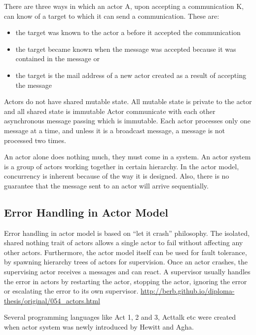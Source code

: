 There are three ways in which an actor A, upon accepting a communication K, can know of a target to which it can send a communication. These are:~\parencite{agha}
\begin{itemize}
  \item the target was known to the actor a before it accepted the communication
  \item the target became known when the message was accepted because it was contained in the message or
  \item the target is the mail address of a new actor created as a result of accepting the message
\end{itemize}

Actors do not have shared mutable state. All mutable state is private to the actor and all shared state is immutable
Actor communicate with each other asynchronous message passing which is immutable.
Each actor processes only one message at a time, and unless it is a broadcast message, a message is not processed two times.

An actor alone does nothing much, they must come in a system. An actor system is a group of actors working together in certain hierarchy.
In the actor model, concurrency is inherent because of the way it is designed. Also, there is no guarantee that the message sent to an actor will arrive sequentially.

\subsection{Error Handling in Actor Model}

Error handling in actor model is based on “let it crash” philosophy. The isolated, shared nothing trait of actors allows a single actor to fail without affecting any other actors. Furthermore, the actor model itself can be used for fault tolerance, by spawning hierarchy trees of actors for supervision. Once an actor crashes, the supervising actor receives a messages and can react. A supervisor usually handles the error in actors by restarting the actor, stopping the actor, ignoring the error or escalating the error to its own supervisor. \url{http://berb.github.io/diploma-thesis/original/054_actors.html}

Several programming languages like Act 1, 2 and 3, Acttalk etc were created when actor system was newly introduced by Hewitt and Agha.


